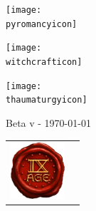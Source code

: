\begin{titlepage}
\begin{center}
\begin{minipage}[c]{\minipagewidth}
\begin{center}
\texttt{[image: \\pyromancyicon]}

\vspace*{\spacebetweeniconrows}

\texttt{[image: \\witchcrafticon]}

\vspace*{\spacebetweeniconrows}

\texttt{[image: \\thaumaturgyicon]}
\end{center}
\end{minipage}\hspace*{\fill}


\vspace*{0.7cm}

{\titlefont\fontsize{50}{60}\selectfont \booktitle
\vspace{0.4cm}

\fontsize{14}{16.8}\selectfont Beta v\version{} - \today{}}

\vfill

\begin{tabular}{@{}m{2cm}@{\hskip 20pt}m{13cm}@{}}
\includegraphics[width=2cm]{../Layout/pics/seal_9th.png} &
{\fontsize{10}{12}\selectfont \textcolor{black!50}{\noindent{}}}

\ifdef{\frontpageaddstuff}{{\fontsize{10}{12}\selectfont \noindent\textcolor{black!50}{\frontpageaddstuff}}}{}

\vspace*{10pt}
\noindent{\fontsize{10}{12}\selectfont \textcolor{black!50}{\labels@license}}
\tabularnewline
\end{tabular}


\end{center}

\newpage

\thispagestyle{empty}

{\fontsize{10}{12}\selectfont

\begin{center}\end{center}

}
\end{titlepage}
